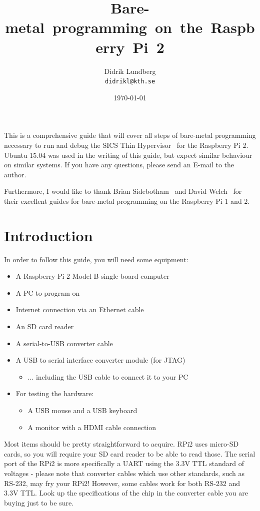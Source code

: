 \documentclass[a4paper,11pt,reqno]{amsart}
\title{\mbox{Bare-metal programming on the Raspberry Pi 2}}
\author{Didrik Lundberg\\
\texttt{didrikl@kth.se}}
\date{\today}
\begin{document}
\maketitle
\noindent
This is a comprehensive guide that will cover all steps of bare-metal programming necessary to run and debug the SICS Thin Hypervisor~\cite{do14sth} for the Raspberry Pi 2. Ubuntu 15.04 was used in the writing of this guide, but expect similar behaviour on similar systems. If you have any questions, please send an E-mail to the author.

Furthermore, I would like to thank Brian Sidebotham~\cite{sidebotham14guide} and David Welch~\cite{welch14guide} for their excellent guides for bare-metal programming on the Raspberry Pi 1 and 2.
\section{Introduction}
In order to follow this guide, you will need some equipment:
\begin{itemize}
  \item A Raspberry Pi 2 Model B single-board computer
  \item A PC to program on
  \item Internet connection via an Ethernet cable
  \item An SD card reader
  \item A serial-to-USB converter cable
  \item A USB to serial interface converter module (for JTAG)
   \begin{itemize}
    \item ... including the USB cable to connect it to your PC
  \end{itemize}
  \item For testing the hardware:
  \begin{itemize}
    \item A USB mouse and a USB keyboard
    \item A monitor with a HDMI cable connection
  \end{itemize}
\end{itemize}
Most items should be pretty straightforward to acquire. RPi2 uses micro-SD cards, so you will require your SD card reader to be able to read those. The serial port of the RPi2 is more specifically a UART using the 3.3V TTL standard of voltages - please note that converter cables which use other standards, such as RS-232, may fry your RPi2! However, some cables work for both RS-232 and 3.3V TTL. Look up the specifications of the chip in the converter cable you are buying just to be sure.
\end{document}
